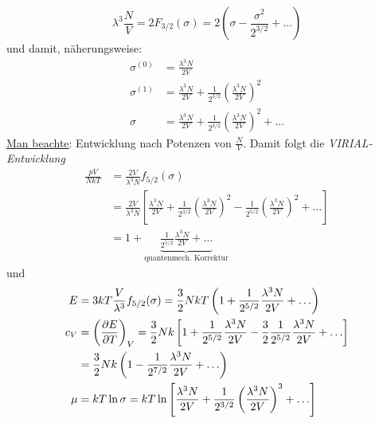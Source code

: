 \begin{enumerate}[A)]
\begin{enumerate}[i)]
        \begin{equation}
            \lambda^3 \frac{N}{V} = 2 F_{3/2}(\sigma) = 2 \left( \sigma - \frac{\sigma^2}{2^{3/2}} + \ldots \right)
        \end{equation}
        und damit, näherungsweise:
        \begin{equation}
            \begin{split}
                \sigma^{(0)} &= \frac{\lambda^3 N}{2 V} \\
                \sigma^{(1)} &= \frac{\lambda^3 N}{2 V} + \frac{1}{2^{3/2}} \left( \frac{\lambda^3 N}{2 V} \right)^2 \\
                \sigma &= \frac{\lambda^3 N}{2 V} + \frac{1}{2^{3/2}} \left( \frac{\lambda^3 N}{2 V} \right)^2 + \ldots
            \end{split}
        \end{equation}
        \underline{Man beachte}: Entwicklung nach Potenzen von $\frac{N}{V}$. Damit folgt die \emph{VIRIAL-Entwicklung}
        \begin{equation}
            \begin{split}
                \frac{p V}{N k T} &= \frac{2 V}{\lambda^3 N} f_{5/2} (\sigma) \\
                &= \frac{2 V}{\lambda^3 N} \left[ \frac{\lambda^3 N}{2 V} + \frac{1}{2^{3/2}} \left( \frac{\lambda^3 N}{2 V} \right)^2 - \frac{1}{2^{5/2}}  \left( \frac{\lambda^3 N}{2 V} \right)^2 + \ldots \right] \\
                &= 1 + \underbrace{\frac{1}{2^{5/2}} \frac{\lambda^3 N}{2 V} + \ldots}_{\text{quantenmech. Korrektur}}
            \end{split}
        \end{equation}
        und
        \begin{equation}
            \begin{split}
                E &= 3 k T \frac{V}{\lambda^3} f_{5/2}(\sigma) = \frac{3}{2} N k T \left( 1 + \frac{1}{2^{5/2}} \frac{\lambda^3 N}{2 V}+ \ldots \right) \\
                c_V &= \pdi{E}{T}{V} = \frac{3}{2} N k \left[ 1 + \frac{1}{2^{5/2}} \frac{\lambda^3 N}{2 V} - \frac{3}{2} \frac{1}{2^{5/2}} \frac{\lambda^3 N}{2 V} + \ldots \right] \\
                &= \frac{3}{2} N k \left( 1 - \frac{1}{2^{7/2}} \frac{\lambda^3 N}{2 V} + \ldots \right)  \\
                \mu &= k T \ln \sigma = k T \ln \left[ \frac{\lambda^3 N}{2 V} + \frac{1}{2^{3/2}}\left( \frac{\lambda^3 N}{2 V} \right)^3 + \ldots \right]

\end{split}
\end{equation}
\end{enumerate}
\end{enumerate}
